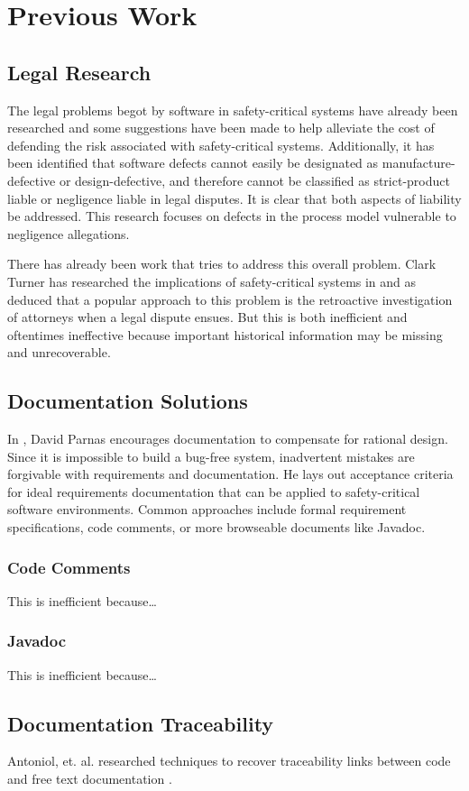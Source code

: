 \section{Previous Work}

\subsection{Legal Research}
The legal problems begot by software in safety-critical systems have already
been researched \cite{Turner1996, Turner2000} and some suggestions have been
made to help alleviate the cost of defending the risk associated with
safety-critical systems\cite{Turner2001}. Additionally, it has been identified
that software defects cannot easily be designated as manufacture-defective or
design-defective\cite{Turner2000}, and therefore cannot be classified as
strict-product liable or negligence liable in legal disputes. It is clear that
both aspects of liability be addressed. This research focuses on defects in the
process model vulnerable to negligence allegations.

There has already been work that tries to address this overall problem. Clark
Turner has researched the implications of safety-critical systems in
\cite{Turner1996, Turner2000, Turner2001} and as deduced that a popular
approach to this problem is the retroactive investigation of attorneys when a
legal dispute ensues. But this is both inefficient and oftentimes ineffective
because important historical information may be missing and unrecoverable.

\subsection{Documentation Solutions}

In \cite{Parnas1986}, David Parnas encourages documentation to compensate for
rational design. Since it is impossible to build a bug-free system, inadvertent
mistakes are forgivable with requirements and documentation. He lays out
acceptance criteria for ideal requirements documentation that can be applied to
safety-critical software environments. Common approaches include formal
requirement specifications, code comments, or more browseable documents like
Javadoc\cite{Javadoc}.

\subsubsection*{Code Comments}
This is inefficient because\ldots

\subsubsection*{Javadoc}
This is inefficient because\ldots

\subsection{Documentation Traceability}
Antoniol, et. al. researched techniques to recover traceability links between
code and free text documentation \cite{Antoniol2000}.
